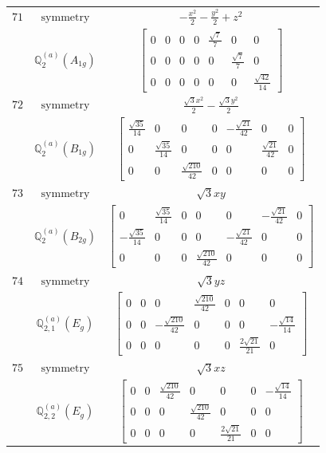 \documentclass[fleqn,8pt,landscape]{jsarticle}
\begin{document}
\begin{longtable}{ccc}
$ 71 $ & $ \text{symmetry} $ & $ - \frac{x^{2}}{2} - \frac{y^{2}}{2} + z^{2} $ \\
$  $ & $ \mathbb{Q}_{2}^{(a)}(A_{1g}) $ & $ \begin{bmatrix} 0 & 0 & 0 & 0 & \frac{\sqrt{7}}{7} & 0 & 0 \\ 0 & 0 & 0 & 0 & 0 & \frac{\sqrt{7}}{7} & 0 \\ 0 & 0 & 0 & 0 & 0 & 0 & \frac{\sqrt{42}}{14} \end{bmatrix} $ \\ \hline
$ 72 $ & $ \text{symmetry} $ & $ \frac{\sqrt{3} x^{2}}{2} - \frac{\sqrt{3} y^{2}}{2} $ \\
$  $ & $ \mathbb{Q}_{2}^{(a)}(B_{1g}) $ & $ \begin{bmatrix} \frac{\sqrt{35}}{14} & 0 & 0 & 0 & - \frac{\sqrt{21}}{42} & 0 & 0 \\ 0 & \frac{\sqrt{35}}{14} & 0 & 0 & 0 & \frac{\sqrt{21}}{42} & 0 \\ 0 & 0 & \frac{\sqrt{210}}{42} & 0 & 0 & 0 & 0 \end{bmatrix} $ \\ \hline
$ 73 $ & $ \text{symmetry} $ & $ \sqrt{3} x y $ \\
$  $ & $ \mathbb{Q}_{2}^{(a)}(B_{2g}) $ & $ \begin{bmatrix} 0 & \frac{\sqrt{35}}{14} & 0 & 0 & 0 & - \frac{\sqrt{21}}{42} & 0 \\ - \frac{\sqrt{35}}{14} & 0 & 0 & 0 & - \frac{\sqrt{21}}{42} & 0 & 0 \\ 0 & 0 & 0 & \frac{\sqrt{210}}{42} & 0 & 0 & 0 \end{bmatrix} $ \\ \hline
$ 74 $ & $ \text{symmetry} $ & $ \sqrt{3} y z $ \\
$  $ & $ \mathbb{Q}_{2,1}^{(a)}(E_{g}) $ & $ \begin{bmatrix} 0 & 0 & 0 & \frac{\sqrt{210}}{42} & 0 & 0 & 0 \\ 0 & 0 & - \frac{\sqrt{210}}{42} & 0 & 0 & 0 & - \frac{\sqrt{14}}{14} \\ 0 & 0 & 0 & 0 & 0 & \frac{2 \sqrt{21}}{21} & 0 \end{bmatrix} $ \\ \hline
$ 75 $ & $ \text{symmetry} $ & $ \sqrt{3} x z $ \\
$  $ & $ \mathbb{Q}_{2,2}^{(a)}(E_{g}) $ & $ \begin{bmatrix} 0 & 0 & \frac{\sqrt{210}}{42} & 0 & 0 & 0 & - \frac{\sqrt{14}}{14} \\ 0 & 0 & 0 & \frac{\sqrt{210}}{42} & 0 & 0 & 0 \\ 0 & 0 & 0 & 0 & \frac{2 \sqrt{21}}{21} & 0 & 0 \end{bmatrix} $ \\ \hline

\end{longtable}
\end{document}
